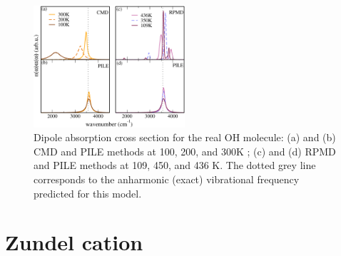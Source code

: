 \documentclass[aps,prb,superscriptaddress,amsmath,amssymb,showpacs,twocolumn]{revtex4}
\begin{document}
\begin{figure}[htbp]
\centering
\includegraphics[width=0.5\textwidth]{figures/comparison_ohanharm_factors.pdf}
\caption{Dipole absorption cross section for the real OH molecule: (a) and (b) CMD and PILE methods at 100, 200, and 300K ; (c)  and (d) RPMD and PILE methods at 109, 450, and 436 K. The dotted grey line corresponds to the anharmonic (exact) vibrational frequency predicted for this model.}
\label{fig:oh-rpmd-cmd-pile}
\end{figure}


\section{Zundel cation}
\end{document}
